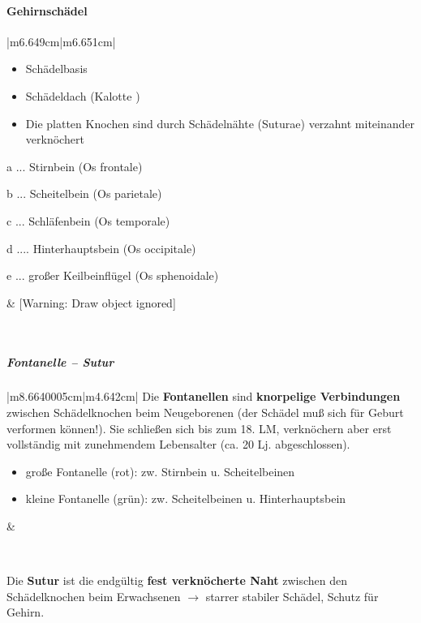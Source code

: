 \documentclass{article}
\newcommand\gEs[1]{\textbf{\textcolor[rgb]{0.0,0.0,0.5019608}{#1}}}
\newcommand\gEs[1]{\textbf{\textcolor[rgb]{0.0,0.0,0.5019608}{#1}}}
\newcommand\gT[1]{\textbf{\textup{\textcolor[rgb]{0.0,0.5019608,0.0}{#1}}}}
\newcommand\gZ[1]{\textcolor[rgb]{0.5019608,0.5019608,0.5019608}{#1}}
\begin{document}
\paragraph{Gehirnsch\"adel}
\begin{center}
\tablehead{}\begin{supertabular}{|m{6.649cm}|m{6.651cm}|}
\hline
\begin{itemize}
\item {\mdseries Sch\"adelbasis}

\item {\mdseries Sch\"adeldach (Kalotte )}

\item {\mdseries Die platten Knochen sind durch Sch\"adeln\"ahte 
(Suturae) verzahnt miteinander verkn\"ochert}

\end{itemize}
{\mdseries a ... Stirnbein \gZ{(Os frontale)}}

{\mdseries b ... Scheitelbein \gZ{(Os parietale)}}

{\mdseries c ... Schl\"afenbein \gZ{(Os temporale)}}

{\mdseries d .... Hinterhauptsbein \gZ{(Os
occipitale)}}

{\mdseries e ... gro{\ss}er Keilbeinfl\"ugel \gZ{(Os
sphenoidale)}}

 &
[Warning: Draw object ignored]

\\\hline
\end{supertabular}
\end{center}
\subparagraph[Fontanelle -- Sutur]{Fontanelle -- Sutur}
\begin{center}
\tablehead{}\begin{supertabular}{|m{8.6640005cm}|m{4.642cm}|}
\hline
{\mdseries Die \gT{Fontanellen} sind
\gEs{knorpelige  Verbindungen}  zwischen 
Sch\"adelknochen beim Neu\-geborenen (der Sch\"adel mu{\ss} sich f\"ur 
Geburt verformen k\"onnen!). Sie schlie{\ss}en  sich bis zum 18. LM,
verkn\"ochern  aber erst vollst\"andig mit zunehmendem  Lebensalter
(ca. 20 Lj. abgeschlossen). }

\begin{itemize}
\item {\mdseries gro{\ss}e Fontanelle (rot): zw. Stirnbein u.
Scheitelbeinen}

\item {\mdseries kleine Fontanelle (gr\"un): zw. Scheitelbeinen u.
Hinter\-haupts\-bein}

\end{itemize}
 &
{\par}

\\\hline
\end{supertabular}
\end{center}
{\mdseries
Die \gT{Sutur} ist die endg\"ultig
\gEs{fest verkn\"ocherte Naht} zwischen den
Sch\"adelknochen beim Erwachsenen ${\rightarrow}$ starrer  stabiler 
Sch\"adel, Schutz  f\"ur Gehirn.}
\end{document}
